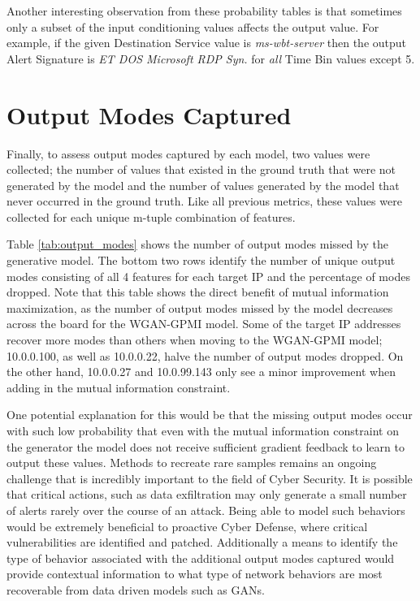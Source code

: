 Another interesting observation from these probability tables is that sometimes only a subset of the input conditioning values affects the output value. For example, if the given Destination Service value is \emph{ms-wbt-server} then the output Alert Signature is \emph{ET DOS Microsoft RDP Syn.} for \emph{all} Time Bin values except 5.

\section{Output Modes Captured}
\label{sec:output}
Finally, to assess output modes captured by each model, two values were collected; the number of values that existed in the ground truth that were not generated by the model and the number of values generated by the model that never occurred in the ground truth. Like all previous metrics, these values were collected for each unique m-tuple combination of features.

Table \ref{tab:output_modes} shows the number of output modes missed by the generative model. The bottom two rows identify the number of unique output modes consisting of all 4 features for each target IP and the percentage of modes dropped.  Note that this table shows the direct benefit of mutual information maximization, as the number of output modes missed by the model decreases across the board for the WGAN-GPMI model. Some of the target IP addresses recover more modes than others when moving to the WGAN-GPMI model; 10.0.0.100, as well as 10.0.0.22,  halve the number of output modes dropped. On the other hand, 10.0.0.27 and 10.0.99.143 only see a minor improvement when adding in the mutual information constraint.

One potential explanation for this would be that the missing output modes occur with such low probability that even with the mutual information constraint on the generator the model does not receive sufficient gradient feedback to learn to output these values. Methods to recreate rare samples remains an ongoing challenge that is incredibly important to the field of Cyber Security. It is possible that critical actions, such as data exfiltration may only generate a small number of alerts rarely over the course of an attack. Being able to model such behaviors would be extremely beneficial to proactive Cyber Defense, where critical vulnerabilities are identified and patched. Additionally a means to identify the type of behavior associated with the additional output modes captured would provide contextual information to what type of network behaviors are most recoverable from data driven models such as GANs. 

